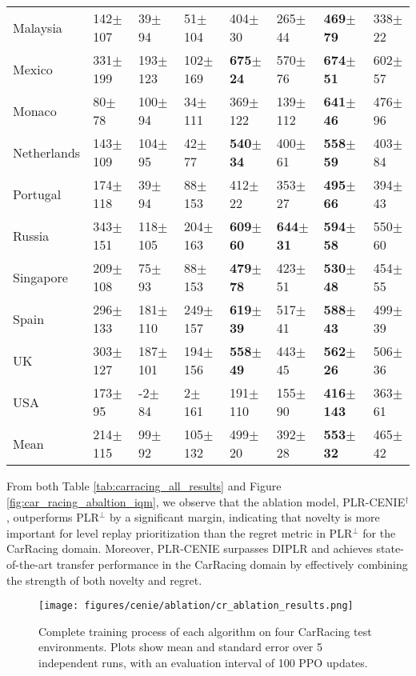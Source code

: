 \begin{table}[ht]
\begin{tabular}{llllllll}
   Malaysia &  142$\pm$107 &   39$\pm$94 &  51$\pm$104 &  404$\pm$30 &  265$\pm$44 &   \textbf{469$\pm$79} & 338$\pm$22 \\
     Mexico &  331$\pm$199 & 193$\pm$123 & 102$\pm$169 &  \textbf{675$\pm$24} &  570$\pm$76 &   \textbf{674$\pm$51} & 602$\pm$57 \\
     Monaco &  80$\pm$78 &  100$\pm$94 &  34$\pm$111 & 369$\pm$122 & 139$\pm$112 &   \textbf{641$\pm$46} & 476$\pm$96 \\
Netherlands &  143$\pm$109 &  104$\pm$95 &   42$\pm$77 &  \textbf{540$\pm$34} &  400$\pm$61 &   \textbf{558$\pm$59} & 403$\pm$84 \\
   Portugal &  174$\pm$118 &   39$\pm$94 &  88$\pm$153 &  412$\pm$22 &  353$\pm$27 &   \textbf{495$\pm$66} & 394$\pm$43 \\
     Russia &  343$\pm$151 & 118$\pm$105 & 204$\pm$163 &  \textbf{609$\pm$60} &  \textbf{644$\pm$31} &   \textbf{594$\pm$58} & 550$\pm$60 \\
  Singapore &  209$\pm$108 &   75$\pm$93 &  88$\pm$153 &  \textbf{479$\pm$78} &  423$\pm$51 &   \textbf{530$\pm$48} & 454$\pm$55 \\
      Spain &  296$\pm$133 & 181$\pm$110 & 249$\pm$157 &  \textbf{619$\pm$39} &  517$\pm$41 &   \textbf{588$\pm$43} & 499$\pm$39 \\
         UK &  303$\pm$127 & 187$\pm$101 & 194$\pm$156 &  \textbf{558$\pm$49} &  443$\pm$45 &   \textbf{562$\pm$26} & 506$\pm$36 \\
        USA & 173$\pm$95 &   -2$\pm$84 &   2$\pm$161 & 191$\pm$110 &  155$\pm$90 &  \textbf{416$\pm$143} & 363$\pm$61 \\ 
\midrule
       Mean &  214$\pm$115 &   99$\pm$92 & 105$\pm$132 &  499$\pm$20 &  392$\pm$28 &   \textbf{553$\pm$32} & 465$\pm$42 \\
\bottomrule
\end{tabular}
\end{table}

From both Table \ref{tab:carracing_all_results} and Figure \ref{fig:car_racing_abaltion_iqm}, we observe that the ablation model, PLR-CENIE$^\dag$, outperforms PLR$^\perp$ by a significant margin, indicating that novelty is more important for level replay prioritization than the regret metric in PLR$^\perp$ for the CarRacing domain. Moreover, PLR-CENIE surpasses DIPLR and achieves state-of-the-art transfer performance in the CarRacing domain by effectively combining the strength of both novelty and regret.  

\begin{figure}[ht]
  \centering
  \texttt{[image: figures/cenie/ablation/cr\_ablation\_results.png]}
  \caption{Complete training process of each algorithm on four CarRacing test environments. Plots show mean and standard error over 5 independent runs, with an evaluation interval of 100 PPO updates.}
  \label{fig:car_racing_plot_results}
\end{figure}

